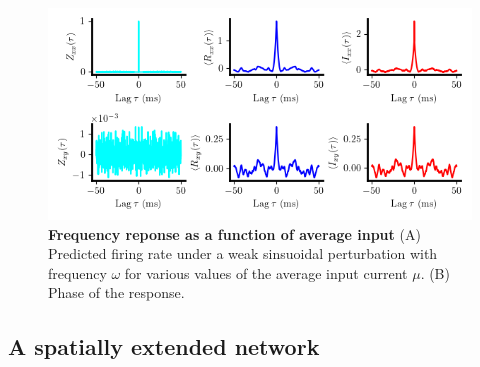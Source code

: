 \documentclass{ucetd}
\begin{document}
\begin{figure}[t!]
\centering
\includegraphics[width=165mm]{figure-12}
\caption{\textbf{Frequency reponse as a function of average input} (A) Predicted firing rate under a weak sinsuoidal perturbation with frequency $\omega$ for various values of the average input current $\mu$. (B) Phase of the response. }
\end{figure}


\subsection{A spatially extended network}
\end{document}
